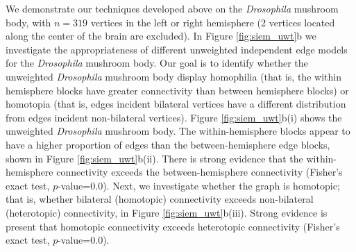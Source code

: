 
We demonstrate our techniques developed above on the \textit{Drosophila} mushroom body, with $n=319$ vertices in the left or right hemisphere (2 vertices located along the center of the brain are excluded). In Figure \ref{fig:siem_uwt}b we investigate the appropriateness of different unweighted independent edge models for the \textit{Drosophila} mushroom body. Our goal is to identify whether the unweighted \textit{Drosophila} mushroom body display homophilia (that is, the within hemisphere blocks have greater connectivity than between hemisphere blocks) or homotopia (that is, edges incident bilateral vertices have a different distribution from edges incident non-bilateral vertices). Figure \ref{fig:siem_uwt}b(i) shows the unweighted \textit{Drosophila} mushroom body. The within-hemisphere blocks appear to have a higher proportion of edges than the between-hemisphere edge blocks, shown in Figure \ref{fig:siem_uwt}b(ii). There is strong evidence that the within-hemisphere connectivity exceeds the between-hemisphere connectivity (Fisher's exact test, $p$-value=$0.0$). Next, we investigate whether the graph is homotopic; that is, whether bilateral (homotopic) connectivity exceeds non-bilateral (heterotopic) connectivity, in Figure \ref{fig:siem_uwt}b(iii). Strong evidence is present that homotopic connectivity exceeds heterotopic connectivity (Fisher's exact test, $p$-value=$0.0$).

